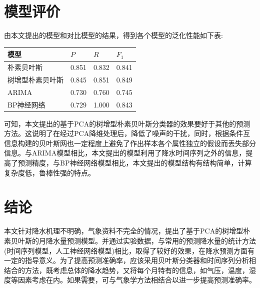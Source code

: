 \documentclass{ctexart}
\begin{document}
\newpage

\section{模型评价}
由本文提出的模型和对比模型的结果，得到各个模型的泛化性能如下表:
\begin{table}[!h]\center\small
\begin{tabular}{|l|l|l|l|}
\hline
模型 &$P$&$R$&$F_{1}$\\
\hline
朴素贝叶斯&0.851& 0.832& 0.841\\\hline
树增型朴素贝叶斯&0.845& 0.851& 0.849\\\hline
ARIMA &0.730& 0.760 & 0.745\\\hline
BP神经网络 & 0.729& 1.000& 0.843\\\hline
\end{tabular}
\end{table}

可知，本文提出的基于PCA的树增型朴素贝叶斯分类器的效果要好于其他的预测方法。这说明了在经过PCA降维处理后，降低了噪声的干扰，同时，根据条件互信息构建的贝叶斯网也一定程度上避免了作出样本各个属性独立的假设而丢失部分信息。与ARIMA模型相比，本文提出的模型利用了降水时间序列之外的信息，提高了预测精度，与BP神经网络模型相比，本文提出的模型结构有结构简单，计算复杂度低，鲁棒性强的特点。

\section*{结论}
   本文针对降水机理不明确，气象资料不完全的情况，提出了基于PCA的树增型朴素贝叶斯的月降水量预测模型。并通过实验数据，与常用的预测降水量的统计方法(时间序列模型，人工神经网络模型)相比，取得了较好的效果，在降水预测方面有一定的指导意义。为了提高预测准确率，应该采用贝叶斯分类器和时间序列分析相结合的方法，既考虑总体的降水趋势，又将每个月特有的信息，如气压，温度，湿度等因素考虑在内。如果需要，可与气象学方法相结合以进一步提高预测准确率。
\end{document}
